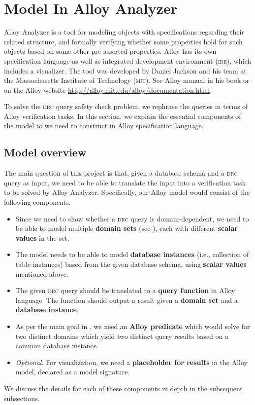 \section{Model In Alloy Analyzer}

Alloy Analyzer is a tool for modeling objects with specifications regarding their related structure, and formally verifying whether some properties hold for such objects based on some other pre-asserted properties. Alloy has its own specification language as well as integrated development environment (\textsc{ide}), which includes a visualizer. The tool was developed by Daniel Jackson and his team at the Massachusetts Institute of Technology (\textsc{mit}). See Alloy manual in his book \cite{Jackson:2012:SAL:2141100} or on the Alloy website {\small\url{http://alloy.mit.edu/alloy/documentation.html}}.

To solve the \textsc{drc} query safety check problem, we rephrase the queries in terms of Alloy verification tasks. In this section, we explain the essential components of the model to we need to construct in Alloy specification language.


\subsection{Model overview}

The main question of this project is that, given a database schema and a \textsc{drc} query as input, we need to be able to translate the input into a verification task to be solved by Alloy Analyzer. Specifically, our Alloy model would consist of the following components.

\begin{itemize}[topsep=0.5pc,itemsep=0.25pc]
    \item  Since we need to show whether a \textsc{drc} query is domain-dependent, we need to be able to model multiple \textbf{domain sets} (see ), each with different \textbf{scalar values} in the set.
    \item  The model needs to be able to model \textbf{database instances} (i.e., collection of table instances) based from the given database schema, using \textbf{scalar values} mentioned above.
    \item  The given \textsc{drc} query should be translated to a \textbf{query function} in Alloy language. The function should output a result given a \textbf{domain set} and a \textbf{database instance}.
    \item  As per the main goal in , we need an \textbf{Alloy predicate} which would solve for two distinct domains which yield two distinct query results based on a common database instance.
    \item \emph{Optional.} For visualization, we need a \textbf{placeholder for results} in the Alloy model, declared as a model signature.
\end{itemize}
We discuss the details for each of these components in depth in the subsequent subsections.


